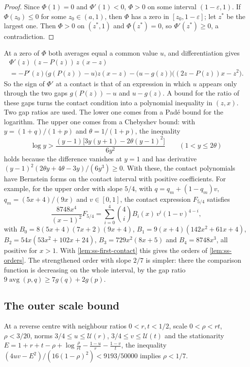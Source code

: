 \begin{proof}
Since $\Phi(1)=0$ and $\Phi'(1)<0$, $\Phi>0$ on some interval $(1-\varepsilon,1)$. If
$\Phi(z_0)\le0$ for some $z_0\in(a,1)$, then $\Phi$ has a zero in $[z_0,1-\varepsilon]$; let $z^*$
be the largest one. Then $\Phi>0$ on $(z^*,1)$ and $\Phi(z^*)=0$, so $\Phi'(z^*)\ge0$, a
contradiction.
\end{proof}

At a zero of $\Phi$ both averages equal a common value $u$, and differentiation gives
\begin{multline*}
  \Phi'(z)\,(z-P(z))\,z\,(x-z)\\
  =-P'(z)\bigl(g(P(z))-u\bigr)z(x-z)-\bigl(u-g(z)\bigr)\bigl((2z-P(z))x-z^2\bigr).
\end{multline*}
So the sign of $\Phi'$ at a contact is that of an expression in which $u$ appears only through
the two gaps $g(P(z))-u$ and $u-g(z)$. A bound for the ratio of these gaps turns the contact
condition into a polynomial inequality in $(z,x)$. Two gap ratios are used. The lower one comes
from a Padé bound for the logarithm. The upper one comes from a Chebyshev bound: with
$y=(1+q)/(1+p)$ and $\theta=1/(1+p)$, the inequality
\[
  \log y>\frac{(y-1)\bigl[3y(y+1)-2\theta(y-1)^2\bigr]}{6y^2}\qquad(1<y\le2\theta)
\]
holds because the difference vanishes at $y=1$ and has derivative
$(y-1)^2(2\theta y+4\theta-3y)/(6y^3)\ge0$. With these, the contact polynomials have Bernstein
forms on the contact interval with positive coefficients. For example, for the upper order with
slope $5/4$, with $q=q_m+(1-q_m)v$, $q_m=(5x+4)/(9x)$ and $v\in[0,1]$, the contact expression
$F_{5/4}$ satisfies
\[
  \frac{8748x^4}{(x-1)^2}F_{5/4}=\sum_{i=0}^4\binom4iB_i(x)\,v^i(1-v)^{4-i},
\]
with $B_0=8(5x+4)(7x+2)(9x+4)$, $B_1=9(x+4)(142x^2+61x+4)$, $B_2=54x(53x^2+102x+24)$,
$B_3=729x^2(8x+5)$ and $B_4=8748x^3$, all positive for $x>1$. With \cref{lem:ss-first-contact}
this gives the orders of \cref{lem:ss-orders}. The strengthened order with slope $2/7$ is simpler:
there the comparison function is decreasing on the whole interval, by the gap ratio
$9\operatorname{avg}(p,q)\ge7g(q)+2g(p)$.

\subsection{The outer scale bound}\label{app:ss-scale}

\begin{lemma}\label{lem:ss-outer-scale}
At a reverse centre with neighbour ratios $0<r,t<1/2$, scale $0<\rho<rt$, $\rho<3/20$, norms
$3/4\le u\le\mathcal U(r)$, $3/4\le v\le\mathcal U(t)$ and the stationarity
$E=1+r+t-\rho+\log\frac{\rho}{rt}-\frac{1-u}{r}-\frac{1-v}{t}$, the inequality
$(4uv-E^2)/(16(1-\rho)^2)<9193/50000$ implies $\rho<1/7$.
\end{lemma}

